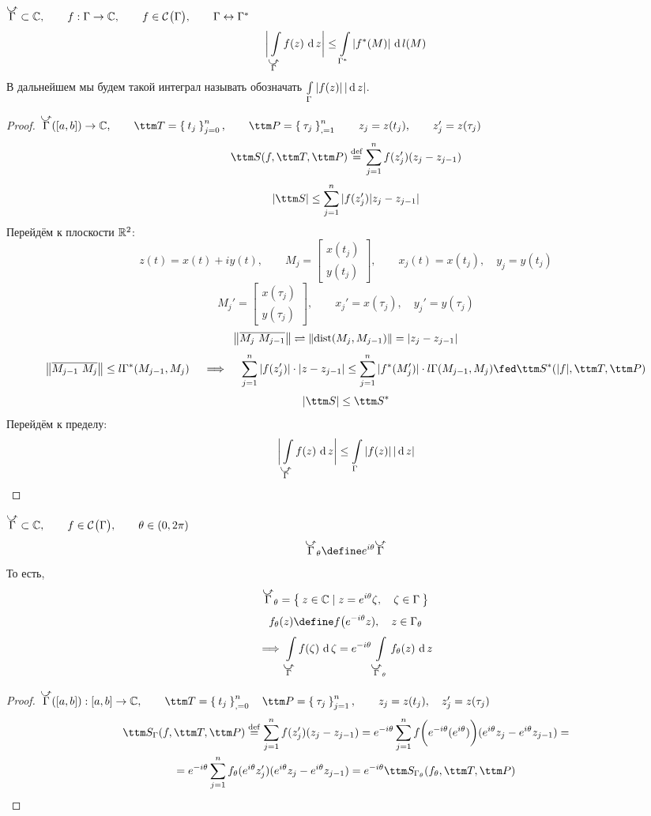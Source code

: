 \begin{property}[7]
	$ \curvedir\Gamma \sub \Co, \qquad f : \Gamma \to \Co, \qquad f \in \Cont \Gamma, \qquad \Gamma \leftrightarrow \Gamma^* $
	$$ \bigg| \cint[z]{\curvedir\Gamma}{f(z)} \bigg| \le \cint{\Gamma^*}{|f^*(M)|} $$
	В дальнейшем мы будем такой интеграл называть обозначать $ \int\limits_{\Gamma} {|f(z)|} \, |\operatorname{d} {z}| $.
\end{property}

\begin{proof}
	$ \curvedir\Gamma ([a, b]) \to \Co, \qquad \ttm T = \seqz[n]{t_j}j, \qquad \ttm P = \seq[n]{\tau_j}, \qquad z_j = z(t_j), \qquad z_j' = z(\tau_j) $
	$$ \ttm S (f, \ttm T, \ttm P) \bydef \sum_{j = 1}^n f(z_j')(z_j - z_{j - 1}) $$
	$$ |\ttm S| \le \sum_{j = 1}^n |f(z_j') |z_j - z_{j - 1}| $$
	Перейдём к плоскости $ \mathbb{R}^2 $:
	$$ z(t) = x(t) + iy(t), \qquad M_j =
	\begin{bmatrix}
		x(t_j) \\
		y(t_j)
	\end{bmatrix}, \qquad x_j(t) = x(t_j), \quad y_j = y(t_j) $$
	$$ M_j' =
	\begin{bmatrix}
		x(\tau_j) \\
		y(\tau_j)
	\end{bmatrix}, \qquad x_j' = x(\tau_j), \quad y_j' = y(\tau_j) $$
	$$ \left\|{\overline{M_j ~ M_{j - 1}}}\right\| \rightleftharpoons \left\|{\operatorname{dist}(M_j, M_{j - 1})}\right\| = |z_j - z_{j - 1}| $$
	$$ \norm{\ol{M_{j - 1} ~ M_{j}}} \le l \Gamma^*(M_{j - 1}, M_j) \quad \implies \quad \sum_{j = 1}^n |f(z_j')| \cdot |z - z_{j - 1}| \le \sum_{j = 1}^n |f^*(M_j')| \cdot l \Gamma(M_{j - 1}, M_j) \fed \ttm S^*(|f|, \ttm T, \ttm P) $$
	$$ |\ttm S| \le \ttm S^* $$
	Перейдём к пределу:
	$$ \bigg| \cint[z]{\curvedir\Gamma}{f(z)} \bigg| \le \acint\Gamma{|f(z)|} $$
\end{proof}

\begin{property}[8]
	$ \curvedir\Gamma \sub \Co, \qquad f \in \Cont \Gamma, \qquad \theta \in (0, 2\pi) $
	$$ \curvedir\Gamma_\theta \define e^{i\theta}\curvedir\Gamma $$
	То есть,
	$$ \curvedir\Gamma_\theta = \set{z \in \Co \mid z = e^{i\theta}\zeta, \quad \zeta \in \Gamma} $$
	$$ f_\theta(z) \define f \big( e^{-i\theta}z), \quad z \in \Gamma_\theta $$
	$$ \implies \cint[\zeta]{\curvedir\Gamma}{f(\zeta)} = e^{-i\theta} \cint[z]{\curvedir\Gamma_\theta}{f_\theta(z)} $$
\end{property}

\begin{proof}
	$ \curvedir\Gamma ([a, b]) : [a, b] \to \Co, \qquad \ttm T = \seqz[n]{t_j}, \quad \ttm P = \seq[n]{\tau_j}j, \qquad z_j = z(t_j), \quad z_j' = z(\tau_j) $
	\begin{multline*}
		\ttm S_\Gamma(f, \ttm T, \ttm P) \bydef \sum_{j = 1}^n f(z_j')(z_j - z_{j - 1}) = e^{-i\theta} \sum_{j = 1}^n f \bigg( e^{-i\theta}(e^{i\theta}) \bigg) (e^{i\theta}z_j - e^{i\theta}z_{j - 1}) = \\
		= e^{-i\theta} \sum_{j = 1}^n f_\theta(e^{i\theta}z_j')(e^{i\theta}z_j - e^{i\theta}z_{j - 1}) = e^{-i\theta} \ttm S_{\Gamma_\theta}(f_\theta, \ttm T, \ttm P)
	\end{multline*}
\end{proof}

